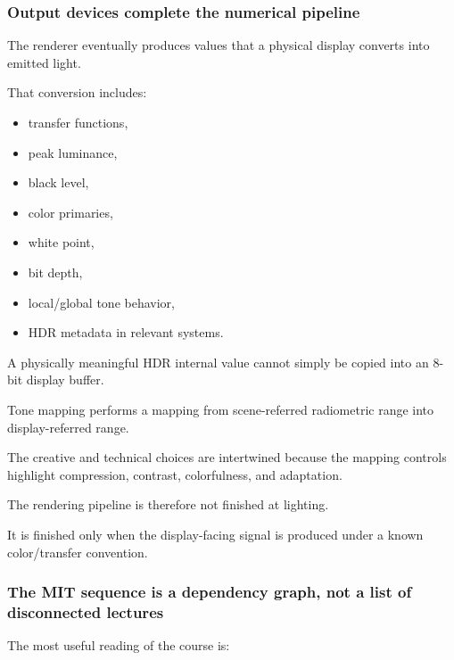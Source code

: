 \subsubsection{Output devices complete the numerical pipeline}\label{03-visual-computing-i-ch001-output-devices-complete-the-numerical-pipeline}

The renderer eventually produces values that a physical display converts into emitted light.

That conversion includes:

\begin{itemize}
\tightlist
\item
  transfer functions,
\item
  peak luminance,
\item
  black level,
\item
  color primaries,
\item
  white point,
\item
  bit depth,
\item
  local/global tone behavior,
\item
  HDR metadata in relevant systems.
\end{itemize}

A physically meaningful HDR internal value cannot simply be copied into an 8-bit display buffer.

Tone mapping performs a mapping from scene-referred radiometric range into display-referred range.

The creative and technical choices are intertwined because the mapping controls highlight compression, contrast, colorfulness, and adaptation.

The rendering pipeline is therefore not finished at lighting.

It is finished only when the display-facing signal is produced under a known color/transfer convention.

\subsubsection{The MIT sequence is a dependency graph, not a list of disconnected lectures}\label{03-visual-computing-i-ch001-the-mit-sequence-is-a-dependency-graph-not-a-list-of-disconnected-lectures}

The most useful reading of the course is:

